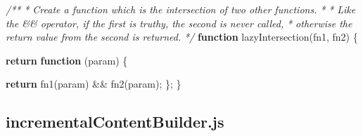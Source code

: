 \documentclass[]{article}
\newenvironment{Shaded}{}{}
\newcommand{\KeywordTok}[1]{\textcolor[rgb]{0.00,0.44,0.13}{\textbf{{#1}}}}
\newcommand{\CommentTok}[1]{\textcolor[rgb]{0.38,0.63,0.69}{\textit{{#1}}}}
\newcommand{\FunctionTok}[1]{\textcolor[rgb]{0.02,0.16,0.49}{{#1}}}
\newcommand{\NormalTok}[1]{{#1}}
\begin{document}
\begin{Shaded}
\begin{Highlighting}[]
\CommentTok{/**}
\CommentTok{ * Create a function which is the intersection of two other functions.}
\CommentTok{ * }
\CommentTok{ * Like the && operator, if the first is truthy, the second is never called,}
\CommentTok{ * otherwise the return value from the second is returned.}
\CommentTok{ */}
\KeywordTok{function} \FunctionTok{lazyIntersection}\NormalTok{(fn1, fn2) \{}

   \KeywordTok{return} \KeywordTok{function} \NormalTok{(param) \{}
                                                              
      \KeywordTok{return} \FunctionTok{fn1}\NormalTok{(param) && }\FunctionTok{fn2}\NormalTok{(param);}
   \NormalTok{\};   }
\NormalTok{\}}

\end{Highlighting}
\end{Shaded}

\pagebreak

\subsection{incrementalContentBuilder.js}
\end{document}
